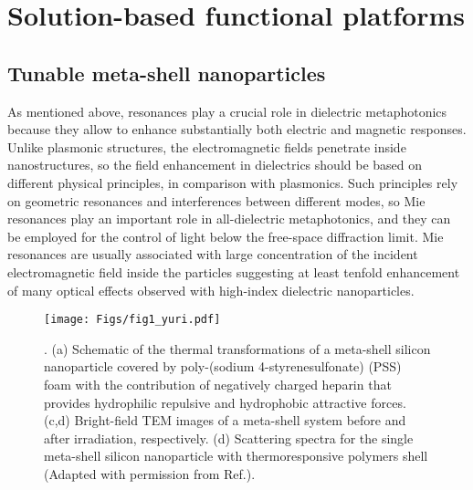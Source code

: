 \documentclass[journal=chreay,manuscript=review]{achemso}
\begin{document}
\section{Solution-based functional platforms}

\subsection{Tunable meta-shell nanoparticles}

As mentioned above, resonances play a crucial role in dielectric metaphotonics because they allow to enhance substantially both electric and magnetic responses. Unlike plasmonic structures, the electromagnetic fields penetrate inside nanostructures, so the field enhancement in dielectrics should be based on different physical principles, in comparison with plasmonics. Such principles rely on geometric resonances and interferences between different modes, so Mie resonances play an important role in all-dielectric metaphotonics\cite{kuznetsov2016optically,staude2017metamaterial,kruk2017functional}, and they can be employed for the control of light below the free-space diffraction limit. Mie resonances are usually associated with large concentration of the incident electromagnetic field inside the particles\cite{kapitanova2017giant} suggesting at least tenfold enhancement of many optical effects observed with high-index dielectric nanoparticles.

\begin{figure}[h]
    \centering
    \texttt{[image: Figs/fig1\_yuri.pdf]}
    \caption{. (a) Schematic of the thermal transformations of a meta-shell silicon nanoparticle covered by poly-(sodium 4-styrenesulfonate) (PSS) foam with the contribution of negatively charged heparin that provides hydrophilic repulsive and hydrophobic attractive forces. (c,d) Bright-field TEM images of a meta-shell system before and after irradiation, respectively.  (d) Scattering spectra for the single meta-shell silicon nanoparticle with thermoresponsive polymers shell (Adapted with permission from Ref.).}
    \label{fig:yuri1}
\end{figure}
\end{document}
